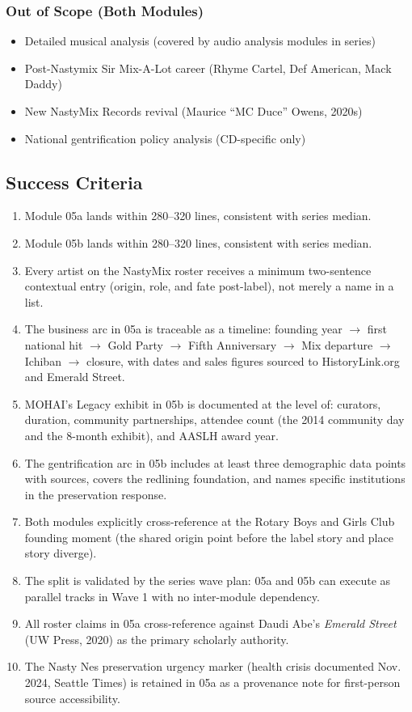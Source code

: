 \documentclass[11pt,letterpaper]{article}
\begin{document}
\subsubsection{Out of Scope (Both Modules)}

\begin{itemize}
\item Detailed musical analysis (covered by audio analysis modules in series)
\item Post-Nastymix Sir Mix-A-Lot career (Rhyme Cartel, Def American, Mack Daddy)
\item New NastyMix Records revival (Maurice ``MC Duce'' Owens, 2020s)
\item National gentrification policy analysis (CD-specific only)
\end{itemize}

\subsection{Success Criteria}

\begin{enumerate}
\item Module 05a lands within 280--320 lines, consistent with series median.
\item Module 05b lands within 280--320 lines, consistent with series median.
\item Every artist on the NastyMix roster receives a minimum two-sentence contextual entry
   (origin, role, and fate post-label), not merely a name in a list.
\item The business arc in 05a is traceable as a timeline: founding year $\rightarrow$ first
   national hit $\rightarrow$ Gold Party $\rightarrow$ Fifth Anniversary $\rightarrow$ Mix
   departure $\rightarrow$ Ichiban $\rightarrow$ closure, with dates and sales figures sourced
   to HistoryLink.org and Emerald Street.
\item MOHAI's Legacy exhibit in 05b is documented at the level of: curators, duration, community
   partnerships, attendee count (the 2014 community day and the 8-month exhibit), and AASLH
   award year.
\item The gentrification arc in 05b includes at least three demographic data points with sources,
   covers the redlining foundation, and names specific institutions in the preservation response.
\item Both modules explicitly cross-reference at the Rotary Boys and Girls Club founding moment
   (the shared origin point before the label story and place story diverge).
\item The split is validated by the series wave plan: 05a and 05b can execute as parallel tracks
   in Wave 1 with no inter-module dependency.
\item All roster claims in 05a cross-reference against Daudi Abe's \textit{Emerald Street}
   (UW Press, 2020) as the primary scholarly authority.
\item The Nasty Nes preservation urgency marker (health crisis documented Nov. 2024, Seattle Times)
   is retained in 05a as a provenance note for first-person source accessibility.
\end{enumerate}
\end{document}
